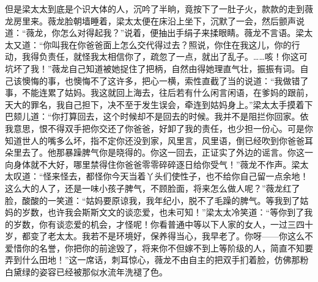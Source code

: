 \par 但是梁太太到底是个识大体的人，沉吟了半晌，竟按下了一肚子火，款款的走到薇龙房里来。薇龙脸朝墙睡着，梁太太便在床沿上坐下，沉默了一会，然后颤声说道：“薇龙，你怎么对得起我？”说着，便抽出手绢子来揉眼睛。薇龙不言语。梁太太又道：“你叫我在你爸爸面上怎么交代得过去？照说，你住在我这儿，你的行动，我得负责任，就怪我太相信你了，疏忽了一点，就出了乱子。……咳！你这可坑坏了我！”薇龙自己知道被她捉住了把柄，自然由得她理直气壮，振振有词。自己该懊悔的事，也懊悔不了这许多，把心一横，索性直截了当的说道：“我做错了事，不能连累了姑妈。我这就回上海去，往后若有什么闲言闲语，在爹妈的跟前，天大的罪名，我自己担下，决不至于发生误会，牵连到姑妈身上。”梁太太手摸着下巴颏儿道：“你打算回去，这个时候却不是回去的时候。我并不是阻拦你回家。依我意思，恨不得双手把你交还了你爸爸，好卸了我的责任，也少担一份心。可是你知道世人的嘴多么坏，指不定你还没到家，风里言，风里语，倒已经吹到你爸爸耳朵里去了。他那暴躁脾气你是晓得的。你这一回去，正证实了外边的谣言。你这一向身体就不大好，哪里禁得住你爸爸零零碎碎逐日给你受气！”薇龙不作声。梁太太叹道：“怪来怪去，都怪你今天当着丫头们使性子，也不给你自己留一点余地！这么大的人了，还是一味小孩子脾气，不顾脸面，将来怎么做人呢？”薇龙红了脸，酸酸的一笑道：“姑妈要原谅我，我年纪小，脱不了毛躁的脾气。等我到了姑妈的岁数，也许我会斯斯文文的谈恋爱，也未可知！”梁太太冷笑道：“等你到了我的岁数，你有谈恋爱的机会，才怪呢！你看普通中等以下人家的女人，一过三四十岁，都变了老太太。我若不是环境好，保养得当心，我早老了。你呀——你这么不爱惜你的名誉，你把你的前途毁了，将来你不但嫁不到上等阶级的人，简直不知要弄到什么田地！”这一席话，刺耳惊心，薇龙不由自主的把双手扪着脸，仿佛那粉白黛绿的姿容已经被那似水流年洗褪了色。
